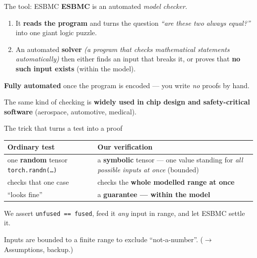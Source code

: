 \documentclass[aspectratio=169,11pt]{beamer}
\begin{document}
\begin{frame}{The tool: ESBMC}
  \textbf{ESBMC} is an automated \emph{model checker}.

  \bigskip
  \begin{enumerate}
    \item It \textbf{reads the program} and turns the question \emph{``are these two always
      equal?''} into one giant logic puzzle.
    \item An automated \textbf{solver} \emph{(a program that checks mathematical statements
      automatically)} then either finds an input that breaks it, or proves that
      \textbf{no such input exists} (within the model).
  \end{enumerate}

  \medskip
  \begin{block}{}
    \centering \textbf{Fully automated} once the program is encoded --- you write \emph{no} proofs by hand.
  \end{block}

  \smallskip
  {\footnotesize The same kind of checking is \textbf{widely used in chip design and safety-critical
  software} (aerospace, automotive, medical).}
\end{frame}

\begin{frame}{The trick that turns a test into a proof}
  \centering
  \begin{tabular}{@{}p{} p{}@{}}
    \toprule
    \textbf{Ordinary test} & \textbf{Our verification} \\
    \midrule
    one \textbf{random} tensor \texttt{torch.randn(\dots)} & a \textbf{symbolic} tensor --- one value standing for \emph{all possible inputs at once} (bounded) \\[4pt]
    checks that one case & checks the \textbf{whole modelled range at once} \\[4pt]
    ``looks fine'' & a \textbf{guarantee --- within the model} \\
    \bottomrule
  \end{tabular}

  \bigskip
  We assert \texttt{unfused == fused}, feed it \emph{any} input in range, and let ESBMC settle it.

  \medskip
  {\footnotesize Inputs are bounded to a finite range to exclude ``not-a-number''. ($\rightarrow$ Assumptions, backup.)}
\end{frame}
\end{document}
